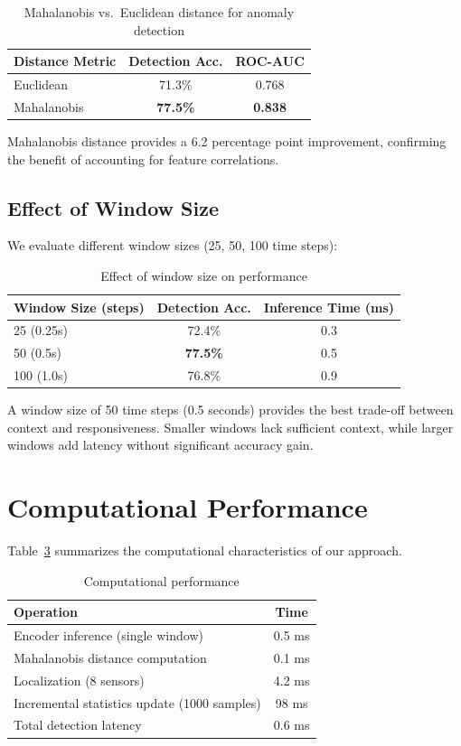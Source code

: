 \begin{table}[htbp]
\centering
\caption{Mahalanobis vs.\ Euclidean distance for anomaly detection}
\label{tab:ablation_distance}
\begin{tabular}{@{}lcc@{}}
\toprule
Distance Metric & Detection Acc. & ROC-AUC \\
\midrule
Euclidean & 71.3\% & 0.768 \\
Mahalanobis & \textbf{77.5\%} & \textbf{0.838} \\
\bottomrule
\end{tabular}
\end{table}

Mahalanobis distance provides a 6.2 percentage point improvement, confirming the benefit of accounting for feature correlations.

\subsection{Effect of Window Size}

We evaluate different window sizes (25, 50, 100 time steps):

\begin{table}[htbp]
\centering
\caption{Effect of window size on performance}
\label{tab:ablation_window}
\begin{tabular}{@{}lcc@{}}
\toprule
Window Size (steps) & Detection Acc. & Inference Time (ms) \\
\midrule
25 (0.25s) & 72.4\% & 0.3 \\
50 (0.5s) & \textbf{77.5\%} & 0.5 \\
100 (1.0s) & 76.8\% & 0.9 \\
\bottomrule
\end{tabular}
\end{table}

A window size of 50 time steps (0.5 seconds) provides the best trade-off between context and responsiveness. Smaller windows lack sufficient context, while larger windows add latency without significant accuracy gain.

\section{Computational Performance}

Table~\ref{tab:computational} summarizes the computational characteristics of our approach.

\begin{table}[htbp]
\centering
\caption{Computational performance}
\label{tab:computational}
\begin{tabular}{@{}lc@{}}
\toprule
Operation & Time \\
\midrule
Encoder inference (single window) & 0.5 ms \\
Mahalanobis distance computation & 0.1 ms \\
Localization (8 sensors) & 4.2 ms \\
Incremental statistics update (1000 samples) & 98 ms \\
\midrule
Total detection latency & 0.6 ms \\
\bottomrule
\end{tabular}
\end{table}

